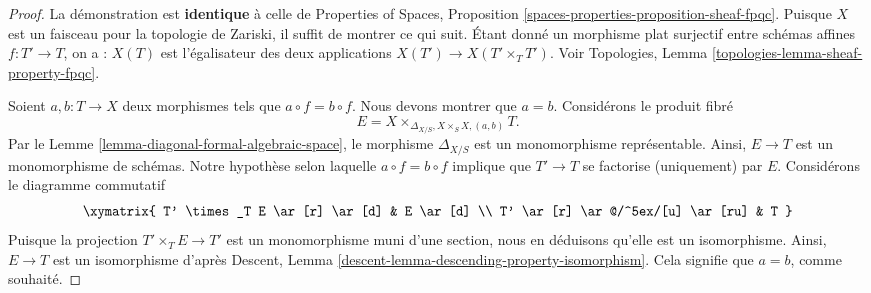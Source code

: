 \begin{proof}
La démonstration est {\bf identique} à celle de
Properties of Spaces, Proposition
\ref{spaces-properties-proposition-sheaf-fpqc}.
Puisque $X$ est un faisceau pour la topologie de Zariski, il
suffit de montrer ce qui suit. Étant donné un morphisme plat surjectif
entre schémas affines $f : T' \to T$, on a :
$X(T)$ est l'égalisateur des deux applications $X(T') \to X(T' \times_T T')$.
Voir Topologies, Lemma \ref{topologies-lemma-sheaf-property-fpqc}.

\medskip\noindent
Soient $a, b : T \to X$ deux morphismes tels que $a \circ f = b \circ f$.
Nous devons montrer que $a = b$. Considérons le produit fibré
$$
E = X \times_{\Delta_{X/S}, X \times_S X, (a, b)} T.
$$
Par le Lemme \ref{lemma-diagonal-formal-algebraic-space},
le morphisme $\Delta_{X/S}$ est un monomorphisme représentable. Ainsi,
$E \to T$ est un monomorphisme de schémas. Notre hypothèse selon laquelle
$a \circ f = b \circ f$ implique que $T' \to T$ se factorise (uniquement) par $E$.
Considérons le diagramme commutatif
$$
\xymatrix{
T' \times_T E \ar[r] \ar[d] & E \ar[d] \\
T' \ar[r] \ar@/^5ex/[u] \ar[ru] & T
}
$$
Puisque la projection $T' \times_T E \to T'$ est un monomorphisme
muni d'une section, nous en déduisons qu'elle est un isomorphisme. Ainsi,
$E \to T$ est un isomorphisme d'après
Descent, Lemma \ref{descent-lemma-descending-property-isomorphism}.
Cela signifie que $a = b$, comme souhaité.


\end{proof}
